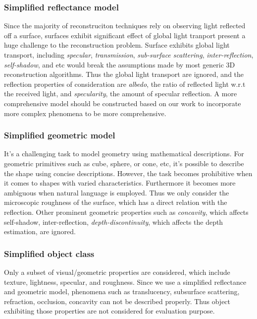 \subsubsection{Simplified reflectance model}
Since the majority of reconstruciton techniques rely on observing light reflected off a surface, surfaces exhibit significant effect of global light tranport present a huge challenge to the reconstruction problem. Surface exhibits global light transport, including \textit{specular}, \textit{transmission}, \textit{sub-surface scattering}, \textit{inter-reflection}, \textit{self-shadow}, and etc would break the assumptions made by most generic 3D reconstruction algorithms. Thus the global light transport are ignored, and the reflection properties of consideration are \textit{albedo}, \ie the ratio of reflected light w.r.t the received light, and \textit{specularity}, \ie the amount of specular reflection. A more comprehensive model should be constructed based on our work to incorporate more complex phenomena to be more comprehensive.

\subsubsection{Simplified geometric model}
It's a challenging task to model geometry using mathematical descriptions. For geometric primitives such as cube, sphere, or cone, etc, it's possible to describe the shape using concise descriptions. However, the task becomes prohibitive when it comes to shapes with varied characteristics. Furthermore it becomes more ambiguous when natural language is employed. Thus we only consider the microscopic roughness of the surface, which has a direct relation with the reflection. Other prominent geometric properties such as \textit{concavity}, which affects self-shadow, inter-reflection, \textit{depth-discontinuity}, which affects the depth estimation, are ignored.

\subsubsection{Simplified object class}
Only a subset of visual/geometric properties are considered, which include texture, lightness, specular, and roughness. Since we use a simplified reflectance and geometric model, phenomena such as translucency, subsurface scattering, refraction, occlusion, concavity can not be described properly. Thus object exhibiting those properties are not considered for evaluation purpose.

